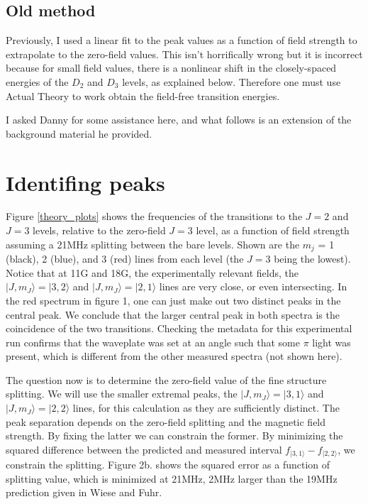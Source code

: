 \documentclass{article}
\begin{document}
\subsection{Old method}
Previously, I used a linear fit to the peak values as a function of field strength to extrapolate to the zero-field values. This isn't horrifically wrong but it is incorrect because for small field values, there is a nonlinear shift in the closely-spaced energies of the $D_2$ and $D_3$ levels, as explained below. Therefore one must use Actual Theory to work obtain the field-free transition energies.

I asked Danny for some assistance here, and what follows is an extension of the background material he provided.

\section{Identifing peaks}



Figure \ref{theory_plots} shows the frequencies of the transitions to the $J=2$ and $J=3$ levels, relative to the zero-field $J=3$ level, as a function of field strength assuming a 21MHz splitting between the bare levels. Shown are the $m_j$ = 1 (black), 2 (blue), and 3 (red) lines from each level (the $J=3$ being the lowest). Notice that at 11G and 18G, the experimentally relevant fields, the $|J,m_J\rangle = |3,2\rangle$ and $|J,m_J\rangle = |2,1\rangle$ lines are very close, or even intersecting. In the red spectrum in figure 1, one can just make out two distinct peaks in the central peak. We conclude that the larger central peak in both spectra is the coincidence of the two transitions. Checking the metadata for this experimental run confirms that the waveplate was set at an angle such that some $\pi$ light was present, which is different from the other measured spectra (not shown here). 

The question now is to determine the zero-field value of the fine structure splitting. We will use the smaller extremal peaks, the $|J,m_J\rangle = |3,1\rangle$ and $|J,m_J\rangle = |2,2\rangle$ lines, for this calculation as they are sufficiently distinct. The peak separation depends on the zero-field splitting and the magnetic field strength. By fixing the latter we can constrain the former. By minimizing the squared difference between the predicted and measured interval $f_{|3,1\rangle}-f_{|2,2\rangle}$, we constrain the splitting. Figure 2b. shows the squared error as a function of splitting value, which is minimized at 21MHz, 2MHz larger than the 19MHz prediction given in Wiese and Fuhr. 
\end{document}

